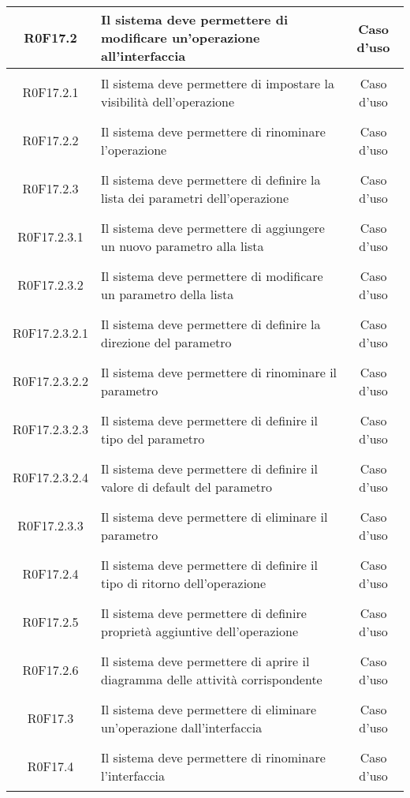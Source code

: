 \documentclass[../AnalisiDeiRequisiti.tex]{subfiles}
\begin{document}
\begin{longtable}{|c|>{\centering}p{7cm}|c|}
	\hypertarget{R0F17.2}{R0F17.2} & Il sistema deve permettere di modificare un'operazione all'interfaccia & Caso d'uso \\ \hline
	\hypertarget{R0F17.2.1}{R0F17.2.1} & Il sistema deve permettere di impostare la visibilità dell'operazione & Caso d'uso \\ \hline
	\hypertarget{R0F17.2.2}{R0F17.2.2} & Il sistema deve permettere di rinominare l'operazione & Caso d'uso \\ \hline
	\hypertarget{R0F17.2.3}{R0F17.2.3} & Il sistema deve permettere di definire la lista dei parametri dell'operazione & Caso d'uso \\ \hline
	\hypertarget{R0F17.2.3.1}{R0F17.2.3.1} & Il sistema deve permettere di aggiungere un nuovo parametro alla lista & Caso d'uso \\ \hline
	\hypertarget{R0F17.2.3.2}{R0F17.2.3.2} & Il sistema deve permettere di modificare un parametro della lista & Caso d'uso \\ \hline
	\hypertarget{R0F17.2.3.2.1}{R0F17.2.3.2.1} & Il sistema deve permettere di definire la direzione del parametro & Caso d'uso \\ \hline
	\hypertarget{R0F17.2.3.2.2}{R0F17.2.3.2.2} & Il sistema deve permettere di rinominare il parametro & Caso d'uso \\ \hline
	\hypertarget{R0F17.2.3.2.3}{R0F17.2.3.2.3} & Il sistema deve permettere di definire il tipo del parametro & Caso d'uso \\ \hline
	\hypertarget{R0F17.2.3.2.4}{R0F17.2.3.2.4} & Il sistema deve permettere di definire il valore di default del parametro & Caso d'uso \\ \hline
	\hypertarget{R0F17.2.3.3}{R0F17.2.3.3} & Il sistema deve permettere di eliminare il parametro & Caso d'uso \\ \hline
	\hypertarget{R0F17.2.4}{R0F17.2.4} & Il sistema deve permettere di definire il tipo di ritorno dell'operazione & Caso d'uso \\ \hline
	\hypertarget{R0F17.2.5}{R0F17.2.5} & Il sistema deve permettere di definire proprietà aggiuntive dell'operazione & Caso d'uso \\ \hline
	\hypertarget{R0F17.2.6}{R0F17.2.6} & Il sistema deve permettere di aprire il diagramma delle attività corrispondente & Caso d'uso \\ \hline
	\hypertarget{R0F17.3}{R0F17.3} & Il sistema deve permettere di eliminare un'operazione dall'interfaccia 
	& Caso d'uso \\ \hline
	\hypertarget{R0F17.4}{R0F17.4} & Il sistema deve permettere di rinominare l'interfaccia & Caso d'uso \\ \hline

\end{longtable}
\end{document}
